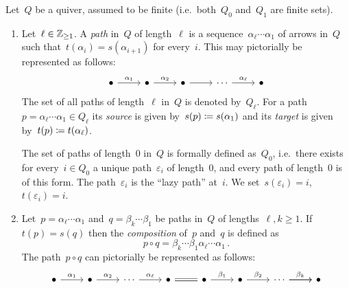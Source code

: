 \begin{definition}
  Let~$Q$ be a quiver, assumed to be finite (i.e.\ both~$Q_0$ and~$Q_1$ are finite sets).
  \begin{enumerate}
    \item
      Let~$\ell \in \mathbb{Z}_{\geq 1}$.
      A \emph{path} in~$Q$ of length~$\ell$ is a sequence~$\alpha_\ell \dotsm \alpha_1$ of arrows in~$Q$ such that~$t(\alpha_i) = s(\alpha_{i+1})$ for every~$i$.
      This may pictorially be represented as follows:
      \[
        \begin{tikzcd}
            \bullet
            \arrow{r}[above]{\alpha_1}
          & \bullet
            \arrow{r}[above]{\alpha_2}
          & \bullet
            \arrow{r}
          & \cdots
            \arrow{r}[above]{\alpha_\ell}
          & \bullet
        \end{tikzcd}
      \]
      The set of all paths of length~$\ell$ in~$Q$ is denoted by~$Q_\ell$.
      For a path~$p = \alpha_\ell \dotsm \alpha_1 \in Q_\ell$ its \emph{source} is given by~$s(p) \coloneqq s(\alpha_1)$ and its \emph{target} is given by~$t(p) \coloneqq t(\alpha_\ell)$.
      
      The set of paths of length~$0$ in~$Q$ is formally defined as~$Q_0$, i.e.\ there exists for every~$i \in Q_0$ a unique path~$\varepsilon_i$ of length~$0$, and every path of length~$0$ is of this form.
      The path~$\varepsilon_i$ is the \enquote{lazy path} at~$i$.
      We set~$s(\varepsilon_i) = i$,~$t(\varepsilon_i) = i$.
    \item
      Let~$p = \alpha_\ell \dotsm \alpha_1$ and~$q = \beta_k \dotsm \beta_1$ be paths in~$Q$ of lengths~$\ell, k \geq 1$.
      If~$t(p) = s(q)$ then the \emph{composition} of~$p$ and~$q$ is defined as
      \[
          p \circ q
        = \beta_k \dotsm \beta_1 \alpha_\ell \dotsm \alpha_1 \,.
      \]
      The path~$p \circ q$ can pictorially be represented as follows:
      \[
        \begin{tikzcd}
            \bullet
            \arrow{r}[above]{\alpha_1}
          & \bullet
            \arrow{r}[above]{\alpha_2}
          & \cdots
            \arrow{r}[above]{\alpha_\ell}
          & \bullet
            \arrow[equal]{r}
          & \bullet
            \arrow{r}[above]{\beta_1}
          & \bullet
            \arrow{r}[above]{\beta_2}
          & \cdots
            \arrow{r}
            \arrow{r}[above]{\beta_k}
          & \bullet
        \end{tikzcd}
      \]
      

\end{enumerate}
\end{definition}
